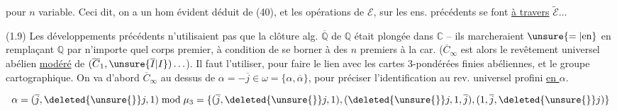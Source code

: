 pour $n$ variable. Ceci dit, on a un hom évident
\diagram{\[
(41)\qquad\begin{tikzcd}[ampersand replacement=\&,column sep=huge]
\mathcal E=(\unsure{\mathfrak S_3|\mathbb G_3}\times\Gamma)
\mathbin{\underset{\scriptscriptstyle1/2}{.}}\pi_\infty\arrow[r]\&
\widetilde{\mathcal E}=(\unsure{\mathfrak S_3|\mathbb G_3}\times A)
\mathbin{\underset{\scriptscriptstyle1/2}{.}}\pi_\infty
\end{tikzcd}
\]}
déduit de (40), et les opérations de $\mathcal E$, sur les ens. précédents
se font \uline{à travers} $\widetilde{\mathcal E}\ldots$

(1.9) Les développements précédents n'utilisaient pas que la clôture alg.
 $\overline{\mathbb Q}$ de $\mathbb Q$ était plongée dans
$\mathbb C$ -- ils marcheraient $\unsure{=|\text{en}}$ en remplaçant
$\mathbb Q$ par n'importe quel corps premier, à condition de se borner à des
$n$ premiers à la car. ($\overline C_\infty$ est alors le revêtement universel
abélien \uline{modéré} de $(\overline C_1,\unsure{\overline I|I})\ldots$).
Il faut l'utiliser, pour faire le lien avec les cartes 3-pondérées finies
abéliennes, et le groupe cartographique. On va d'abord 
$\overline C_\infty$ au dessus de
$\alpha=-\overline j\in\omega=\{\alpha,\overline\alpha\}$, pour préciser
l'identification au rev. universel profini  \uline{en $\alpha$}.

\[
\alpha=(\overline j,\deleted{\unsure{\overline{\vphantom j}}}j,1)\bmod\mu_3
=\{(\overline j,\deleted{\unsure{\overline{\vphantom j}}}j,1),
(\deleted{\unsure{\overline{\vphantom j}}}j,1,\overline j),
(1,\overline j,\deleted{\unsure{\overline{\vphantom j}}}j)\}
\]

